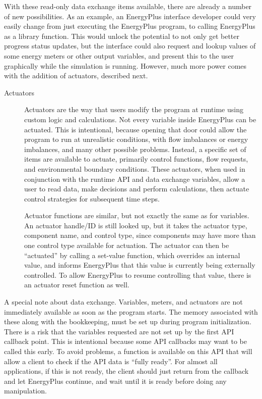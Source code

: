 With these read-only data exchange items available, there are already a number of new possibilities.
As an example, an EnergyPlus interface developer could very easily change from just executing the EnergyPlus program, to calling EnergyPlus as a library function.
This would unlock the potential to not only get better progress status updates, but the interface could also request and lookup values of some energy meters or other output variables, and present this to the user graphically while the simulation is running.
However, much more power comes with the addition of actuators, described next.

\begin{description}
 \item[Actuators] Actuators are the way that users modify the program at runtime using custom logic and calculations.
                  Not every variable inside EnergyPlus can be actuated.
                  This is intentional, because opening that door could allow the program to run at unrealistic conditions, with flow imbalances or energy imbalances, and many other possible problems.
                  Instead, a specific set of items are available to actuate, primarily control functions, flow requests, and environmental boundary conditions.
                  These actuators, when used in conjunction with the runtime API and data exchange variables, allow a user to read data, make decisions and perform calculations, then actuate control strategies for subsequent time steps.

 Actuator functions are similar, but not exactly the same as for variables.
 An actuator handle/ID is still looked up, but it takes the actuator type, component name, and control type, since components may have more than one control type available for actuation.
 The actuator can then be ``actuated'' by calling a set-value function, which overrides an internal value, and informs EnergyPlus that this value is currently being externally controlled.
 To allow EnergyPlus to resume controlling that value, there is an actuator reset function as well.
\end{description}

A special note about data exchange.
Variables, meters, and actuators are not immediately available as soon as the program starts.
The memory associated with these along with the bookkeeping, must be set up during program initialization.
There is a risk that the variables requested are not set up by the first API callback point.
This is intentional because some API callbacks may want to be called this early.
To avoid problems, a function is available on this API that will allow a client to check if the API data is ``fully ready''.
For almost all applications, if this is not ready, the client should just return from the callback and let EnergyPlus continue, and wait until it is ready before doing any manipulation.

